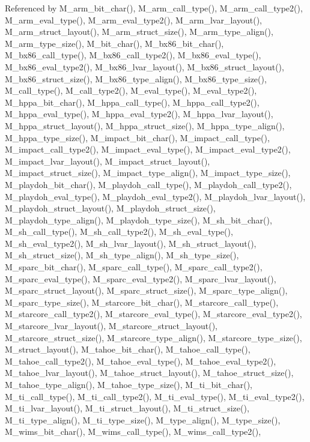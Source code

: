 Referenced by M\_\-arm\_\-bit\_\-char(), M\_\-arm\_\-call\_\-type(), M\_\-arm\_\-call\_\-type2(), M\_\-arm\_\-eval\_\-type(), M\_\-arm\_\-eval\_\-type2(), M\_\-arm\_\-lvar\_\-layout(), M\_\-arm\_\-struct\_\-layout(), M\_\-arm\_\-struct\_\-size(), M\_\-arm\_\-type\_\-align(), M\_\-arm\_\-type\_\-size(), M\_\-bit\_\-char(), M\_\-bx86\_\-bit\_\-char(), M\_\-bx86\_\-call\_\-type(), M\_\-bx86\_\-call\_\-type2(), M\_\-bx86\_\-eval\_\-type(), M\_\-bx86\_\-eval\_\-type2(), M\_\-bx86\_\-lvar\_\-layout(), M\_\-bx86\_\-struct\_\-layout(), M\_\-bx86\_\-struct\_\-size(), M\_\-bx86\_\-type\_\-align(), M\_\-bx86\_\-type\_\-size(), M\_\-call\_\-type(), M\_\-call\_\-type2(), M\_\-eval\_\-type(), M\_\-eval\_\-type2(), M\_\-hppa\_\-bit\_\-char(), M\_\-hppa\_\-call\_\-type(), M\_\-hppa\_\-call\_\-type2(), M\_\-hppa\_\-eval\_\-type(), M\_\-hppa\_\-eval\_\-type2(), M\_\-hppa\_\-lvar\_\-layout(), M\_\-hppa\_\-struct\_\-layout(), M\_\-hppa\_\-struct\_\-size(), M\_\-hppa\_\-type\_\-align(), M\_\-hppa\_\-type\_\-size(), M\_\-impact\_\-bit\_\-char(), M\_\-impact\_\-call\_\-type(), M\_\-impact\_\-call\_\-type2(), M\_\-impact\_\-eval\_\-type(), M\_\-impact\_\-eval\_\-type2(), M\_\-impact\_\-lvar\_\-layout(), M\_\-impact\_\-struct\_\-layout(), M\_\-impact\_\-struct\_\-size(), M\_\-impact\_\-type\_\-align(), M\_\-impact\_\-type\_\-size(), M\_\-playdoh\_\-bit\_\-char(), M\_\-playdoh\_\-call\_\-type(), M\_\-playdoh\_\-call\_\-type2(), M\_\-playdoh\_\-eval\_\-type(), M\_\-playdoh\_\-eval\_\-type2(), M\_\-playdoh\_\-lvar\_\-layout(), M\_\-playdoh\_\-struct\_\-layout(), M\_\-playdoh\_\-struct\_\-size(), M\_\-playdoh\_\-type\_\-align(), M\_\-playdoh\_\-type\_\-size(), M\_\-sh\_\-bit\_\-char(), M\_\-sh\_\-call\_\-type(), M\_\-sh\_\-call\_\-type2(), M\_\-sh\_\-eval\_\-type(), M\_\-sh\_\-eval\_\-type2(), M\_\-sh\_\-lvar\_\-layout(), M\_\-sh\_\-struct\_\-layout(), M\_\-sh\_\-struct\_\-size(), M\_\-sh\_\-type\_\-align(), M\_\-sh\_\-type\_\-size(), M\_\-sparc\_\-bit\_\-char(), M\_\-sparc\_\-call\_\-type(), M\_\-sparc\_\-call\_\-type2(), M\_\-sparc\_\-eval\_\-type(), M\_\-sparc\_\-eval\_\-type2(), M\_\-sparc\_\-lvar\_\-layout(), M\_\-sparc\_\-struct\_\-layout(), M\_\-sparc\_\-struct\_\-size(), M\_\-sparc\_\-type\_\-align(), M\_\-sparc\_\-type\_\-size(), M\_\-starcore\_\-bit\_\-char(), M\_\-starcore\_\-call\_\-type(), M\_\-starcore\_\-call\_\-type2(), M\_\-starcore\_\-eval\_\-type(), M\_\-starcore\_\-eval\_\-type2(), M\_\-starcore\_\-lvar\_\-layout(), M\_\-starcore\_\-struct\_\-layout(), M\_\-starcore\_\-struct\_\-size(), M\_\-starcore\_\-type\_\-align(), M\_\-starcore\_\-type\_\-size(), M\_\-struct\_\-layout(), M\_\-tahoe\_\-bit\_\-char(), M\_\-tahoe\_\-call\_\-type(), M\_\-tahoe\_\-call\_\-type2(), M\_\-tahoe\_\-eval\_\-type(), M\_\-tahoe\_\-eval\_\-type2(), M\_\-tahoe\_\-lvar\_\-layout(), M\_\-tahoe\_\-struct\_\-layout(), M\_\-tahoe\_\-struct\_\-size(), M\_\-tahoe\_\-type\_\-align(), M\_\-tahoe\_\-type\_\-size(), M\_\-ti\_\-bit\_\-char(), M\_\-ti\_\-call\_\-type(), M\_\-ti\_\-call\_\-type2(), M\_\-ti\_\-eval\_\-type(), M\_\-ti\_\-eval\_\-type2(), M\_\-ti\_\-lvar\_\-layout(), M\_\-ti\_\-struct\_\-layout(), M\_\-ti\_\-struct\_\-size(), M\_\-ti\_\-type\_\-align(), M\_\-ti\_\-type\_\-size(), M\_\-type\_\-align(), M\_\-type\_\-size(), M\_\-wims\_\-bit\_\-char(), M\_\-wims\_\-call\_\-type(), M\_\-wims\_\-call\_\-type2(), 